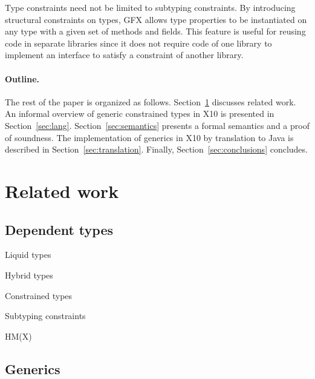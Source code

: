 \documentclass[preprint,nocopyrightspace,9pt]{sigplanconf}
\newcommand\gxx{GFX\xspace}
\begin{document}
Type constraints need not be limited to subtyping constraints.
By introducing structural constraints on types, \gxx allows
type properties to be instantiated on any type with a given set
of methods and fields. This feature is useful for reusing code
in separate libraries since it does not require 
code of one library to implement an interface to satisfy a
constraint of another library.

\paragraph{Outline.}
The rest of the paper is organized as follows.
%
Section~\ref{sec:related} discusses related work.
%
An informal overview of generic constrained types in X10
is presented in
Section~\ref{sec:lang}.  
%
Section~\ref{sec:semantics} presents a formal semantics and a
proof of soundness.
%
The implementation of generics in X10 by translation to Java is described in 
Section~\ref{sec:translation}.
%
Finally, Section~\ref{sec:conclusions} concludes.


\section{Related work}
\label{sec:related}

\subsection{Dependent types}

\cite{dependent-types,xi99dependent,ocrz-ecoop03,aspinall-attapl,cayenne,epigram-matter,calc-constructions}

Liquid types \cite{liquid-types}

Hybrid types \cite{flanagan-popl06,flanagan-fool06}

Constrained types
\cite{sulzmann97type}
\cite{trifonov96}
\cite{pottier01b}

Subtyping constraints
\cite{pottier96simplifying}

HM(X) \cite{pottier01a}


\subsection{Generics}

\cite{unifying-genericity}
\cite{adding-wildcards}
\cite{emir06}
\cite{myers94}
\cite{polyj}
\cite{allen04}
\cite{allen03}
\end{document}
